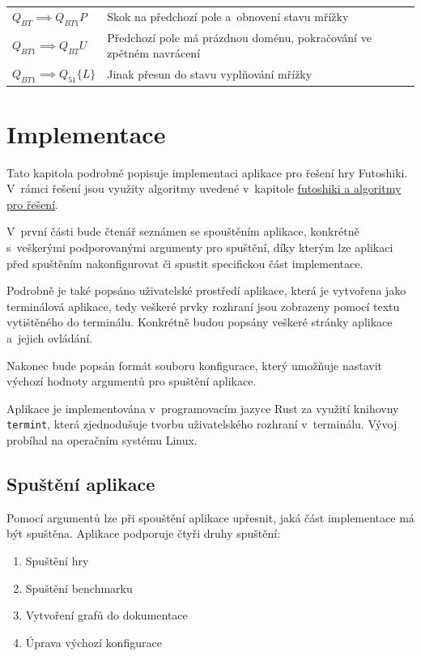 \begin{tabular}{@{}p{4cm} p{10.5cm}@{}}
    \(Q_{BT} \implies Q_{BT1}P\) & Skok na předchozí pole a~obnovení stavu
        mřížky \\
    \(Q_{BT1}{} \implies Q_{BT}U\) & Předchozí pole má prázdnou doménu,
        pokračování ve zpětném navrácení \\
    \(Q_{BT1} \implies Q_{51}\{L\}\) & Jinak přesun do stavu vyplňování mřížky \\
\end{tabular}

\chapter{Implementace}

Tato kapitola podrobně popisuje implementaci aplikace pro řešení hry Futoshiki.
V~rámci řešení jsou využity algoritmy uvedené v~kapitole
\hyperref[sec:futoshikiAlgs]{futoshiki a algoritmy pro řešení}.

V~první části bude čtenář seznámen se spouštěním aplikace, konkrétně
s~veškerými podporovanými argumenty pro spuštění, díky kterým lze aplikaci
před spuštěním nakonfigurovat či spustit specifickou část implementace.

Podrobně je také popsáno uživatelské prostředí aplikace, která je vytvořena
jako terminálová aplikace, tedy veškeré prvky rozhraní jsou zobrazeny pomocí
textu vytištěného do terminálu. Konkrétně budou popsány veškeré stránky
aplikace a~jejich ovládání.

Nakonec bude popsán formát souboru konfigurace, který umožňuje nastavit výchozí
hodnoty argumentů pro spuštění aplikace.

Aplikace je implementována v~programovacím jazyce Rust za využití knihovny
\texttt{termint}, která zjednodušuje tvorbu uživatelského rozhraní v~terminálu.
Vývoj probíhal na operačním systému Linux.

\section{Spuštění aplikace}

Pomocí argumentů lze při spouštění aplikace upřesnit, jaká část implementace
má být spuštěna. Aplikace podporuje čtyři druhy spuštění:
\begin{enumerate}
    \item Spuštění hry
    \item Spuštění benchmarku
    \item Vytvoření grafů do dokumentace
    \item Úprava výchozí konfigurace
\end{enumerate}

